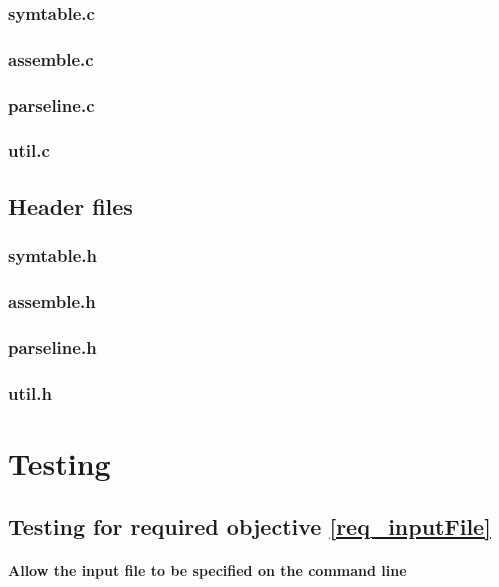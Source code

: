\documentclass[a4paper]{report}
\begin{document}
\subsection{symtable.c}

\subsection{assemble.c}

\subsection{parseline.c}

\subsection{util.c}


\section{Header files}

\subsection{symtable.h}

\subsection{assemble.h}

\subsection{parseline.h}

\subsection{util.h}




\chapter{Testing}

\section{Testing for required objective \ref{req_inputFile}}

\subsubsection{Allow the input file to be specified on the command line}
\end{document}
